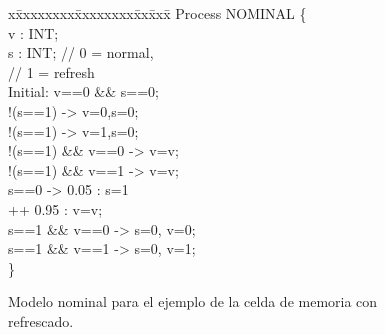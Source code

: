 
\begin{figure}[t]
\centering
\begin{minipage}[t]{.47\textwidth}
\fontsize{10}{10}\selectfont\ttfamily
\begin{tabbing}
x\=xxxxxxxx\=xxxxxxxx\=xx\=xxx\= \kill    
Process NOMINAL \{\\[1ex]
\>v : INT; \\
\>s : INT;  		 \>\>// 0 = normal,\\ 
\>                   \>\>// 1 = refresh\\[1ex]
\>Initial: v==0 \&\& s==0;\\[1ex]
\>[write0]  !(s==1) -> v=0,s=0; \\
\>[write1]  !(s==1) -> v=1,s=0; \\[1ex]
\>[read0] !(s==1) \&\& v==0 -> v=v; \\
\>[read1] !(s==1) \&\& v==1 -> v=v; \\[1ex]
 s==0 -> 0.05 : s=1 \\
\>             \>\>++ 0.95 : v=v; \\[1ex]
\>[refresh] s==1 \&\& v==0 -> s=0, v=0; \\
\>[refresh] s==1 \&\& v==1 -> s=0, v=1; \\[1ex]
\}\\
\end{tabbing}
\end{minipage}
\caption{Modelo nominal para el ejemplo de la celda de memoria con refrescado.} \label{fig:exam_1_mem_cell_nom}
\vspace{-0.5cm}
\end{figure}

